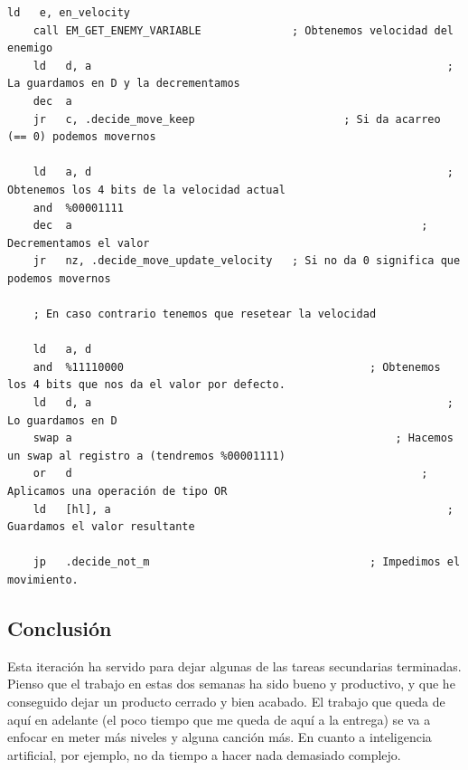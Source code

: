 \begin{lstlisting}[caption={Velocidad de los Enemigos}, label={code:velocity}]
	ld 	 e, en_velocity
	call EM_GET_ENEMY_VARIABLE 				; Obtenemos velocidad del enemigo
	ld 	 d, a 														; La guardamos en D y la decrementamos
	dec  a
	jr 	 c, .decide_move_keep 						; Si da acarreo (== 0) podemos movernos

	ld 	 a, d 														; Obtenemos los 4 bits de la velocidad actual
	and  %00001111
	dec  a 														; Decrementamos el valor
	jr 	 nz, .decide_move_update_velocity 	; Si no da 0 significa que podemos movernos

	; En caso contrario tenemos que resetear la velocidad
	
	ld 	 a, d
	and  %11110000 										; Obtenemos los 4 bits que nos da el valor por defecto.
	ld 	 d, a 														; Lo guardamos en D
	swap a 													; Hacemos un swap al registro a (tendremos %00001111)
	or 	 d 														; Aplicamos una operación de tipo OR
	ld 	 [hl], a 													; Guardamos el valor resultante

	jp 	 .decide_not_m 									; Impedimos el movimiento.
\end{lstlisting}

\subsection{Conclusión}

Esta iteración ha servido para dejar algunas de las tareas secundarias terminadas. Pienso que el trabajo en estas dos semanas ha sido bueno y productivo, y que he conseguido dejar un producto cerrado y bien acabado. El trabajo que queda de aquí en adelante (el poco tiempo que me queda de aquí a la entrega) se va a enfocar en meter más niveles y alguna canción más. En cuanto a inteligencia artificial, por ejemplo, no da tiempo a hacer nada demasiado complejo.

\cleardoublepage


